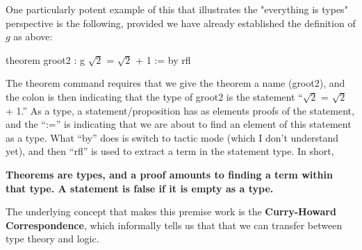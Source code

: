 \documentclass{article}
\theoremstyle{definition}
\newcommand{\1}{\mathbb{1}}
\newcommand{\0}{\mathbb{0}}
\begin{document}
One particularly potent example of this that illustrates the "everything is types" perspective is the following, provided we have already established the definition of $g$ as above:
\begin{center}
    theorem groot2 : g $\sqrt{2}$ = $\sqrt{2}$ + 1 := by rfl
\end{center}
The theorem command requires that we give the theorem a name (groot2), and the colon is then indicating that the type of groot2 is the statement \enquote{$\sqrt{2}$ = $\sqrt{2}$ + 1.} As a type, a statement/proposition has as elements proofs of the statement, and the \enquote{:=} is indicating that we are about to find an element of this statement as a type. What \enquote{by}
does is switch to tactic mode (which I don't understand yet), and then \enquote{rfl} is used to extract a term in the statement type. In short,
\begin{center}
    \textbf{Theorems are types, and a proof amounts to finding a term within that type. A statement is false if it is empty as a type.}
\end{center}
The underlying concept that makes this premise work is the \textbf{Curry-Howard Correspondence}, which informally tells us that that we can transfer between type theory and logic.
\end{document}
